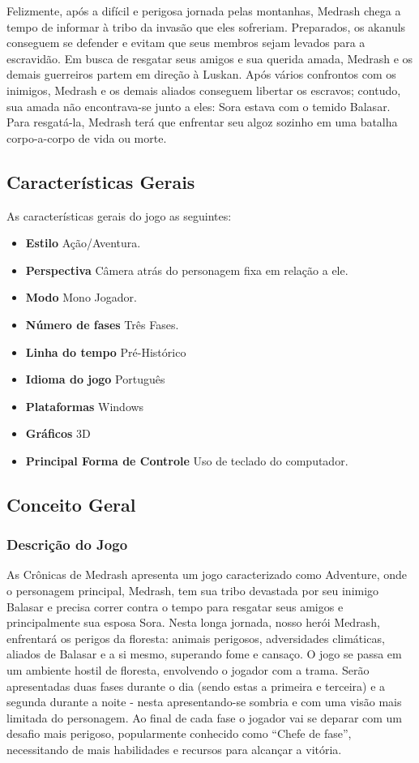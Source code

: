 Felizmente, após a difícil e perigosa jornada pelas montanhas, Medrash 
chega a tempo de informar à tribo da invasão que eles sofreriam. Preparados,
 os akanuls conseguem se defender e evitam que seus membros sejam levados
 para a escravidão. Em busca de resgatar seus amigos e sua querida amada, 
Medrash e os demais guerreiros partem em direção à Luskan. Após vários
 confrontos com os inimigos, Medrash e os demais aliados 
conseguem libertar os escravos; contudo, sua amada não encontrava-se junto 
a eles: Sora estava com o temido Balasar. Para resgatá-la, Medrash terá que
 enfrentar seu algoz sozinho em uma batalha corpo-a-corpo de vida ou morte.

\subsection{Características Gerais}
As características gerais do jogo as seguintes: 
\begin{itemize}
\item {\bf Estilo}
Ação/Aventura. 
\item{\bf Perspectiva}
Câmera atrás do personagem fixa em relação a ele.
\item{\bf Modo}
Mono Jogador.
\item{\bf Número de fases}
Três Fases.
\item{ \bf Linha do tempo}
Pré-Histórico 
\item{ \bf Idioma do jogo}
Português
\item{ \bf Plataformas}
Windows
\item{\bf Gráficos}
3D
\item{ \bf Principal Forma de Controle}
Uso de teclado do computador.
\end{itemize}

\subsection{Conceito Geral}

\subsubsection{Descrição do Jogo}
As Crônicas de Medrash apresenta um jogo caracterizado como Adventure,
 onde o personagem principal, Medrash, tem sua tribo devastada por seu inimigo 
Balasar e precisa correr contra o tempo para resgatar seus amigos e 
principalmente sua esposa Sora.
Nesta longa jornada, nosso herói Medrash, enfrentará os perigos da floresta: 
animais perigosos, adversidades climáticas, aliados de Balasar e a si mesmo, 
superando fome e cansaço.
O jogo se passa em um ambiente hostil de floresta, envolvendo o jogador com a 
trama. Serão apresentadas duas fases durante o dia (sendo estas a primeira e terceira)
 e a segunda durante a noite - nesta apresentando-se sombria e com uma visão 
mais limitada do personagem. Ao final de cada fase o jogador vai se deparar com 
um desafio mais perigoso, popularmente conhecido como ``Chefe de fase'', necessitando 
de mais habilidades e recursos para alcançar a vitória.

